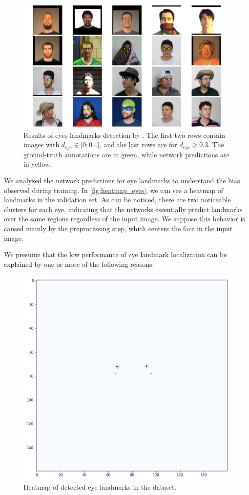 \begin{figure}[htb]
\centering
\includegraphics[width=\linewidth]{images/eyes/detections.pdf}
\caption{Results of eyes landmarks detection by \methodname. The first two rows contain images with $d_{eye} \in [0;0.1[$, and the last rows are for $d_{eye} \geq 0.3$. The ground-truth annotations are in green, while network predictions are in yellow.}
\label{fig:eyes_detection}
\end{figure}
 
We analyzed the network predictions for eye landmarks to understand the bias observed during training. In \autoref{fig:heatmap_eyes}, we can see a heatmap of landmarks in the validation set. As can be noticed, there are two noticeable clusters for each eye, indicating that the networks essentially predict landmarks over the same regions regardless of the input image. We suppose this behavior is caused mainly by the preprocessing step, which centers the face in the input image.
 
We presume that the low performance of eye landmark localization can be explained by one or more of the following reasons:
 
\begin{figure}[htb]
\centering
\includegraphics[width=0.6\linewidth]{images/eyes/heatmap_eyes_v0.914.png}
\caption{Heatmap of detected eye landmarks in the \adhoc dataset.}
\label{fig:heatmap_eyes}
\end{figure}
 
